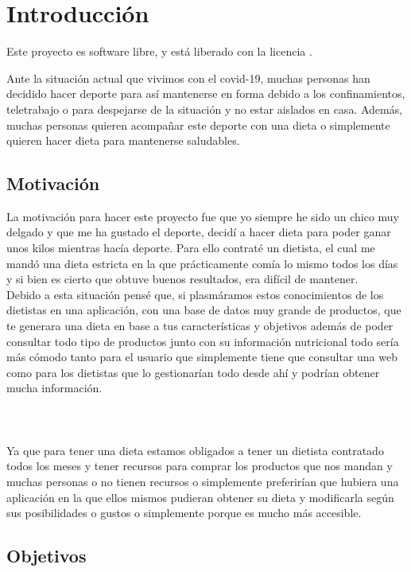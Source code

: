 \chapter{Introducción} \label{sec:introduccion}

Este proyecto es software libre, y está liberado con la licencia \cite{gplv3}.

Ante la situación actual que vivimos con el covid-19, muchas personas han decidido hacer deporte 
para así mantenerse en forma debido a los confinamientos, teletrabajo o para despejarse de la 
situación y no estar aislados en casa. Además, muchas personas quieren acompañar este deporte con una dieta o simplemente quieren hacer 
dieta para mantenerse saludables.

\section{Motivación} \label{sec:motivacion}

La motivación para hacer este proyecto fue que yo siempre he sido un chico muy delgado y que 
me ha gustado el deporte, decidí a hacer dieta para poder ganar unos kilos mientras hacía deporte.
Para ello contraté un dietista, el cual me mandó una dieta estricta en la que prácticamente comía lo mismo 
todos los días y si bien es cierto que obtuve buenos resultados, era difícil de mantener. \\

Debido a esta situación pensé que, si plasmáramos estos conocimientos de los dietistas en una aplicación, con una base de datos 
muy grande de productos, que te generara una dieta en base a tus características y objetivos 
además de poder consultar todo tipo de productos junto con su información nutricional todo sería más cómodo tanto para
el usuario que simplemente tiene que consultar una web como para los dietistas que lo gestionarían todo desde ahí
y podrían obtener mucha información. \\ \\
\\\\
Ya que para tener una dieta estamos obligados a tener un dietista contratado todos los meses y tener recursos para 
comprar los productos que nos mandan y muchas personas o no tienen recursos o simplemente preferirían
que hubiera una aplicación en la que ellos mismos pudieran obtener su dieta y modificarla según sus 
posibilidades o gustos o simplemente porque es mucho más accesible.

\section{Objetivos} \label{sec:objetivos}

